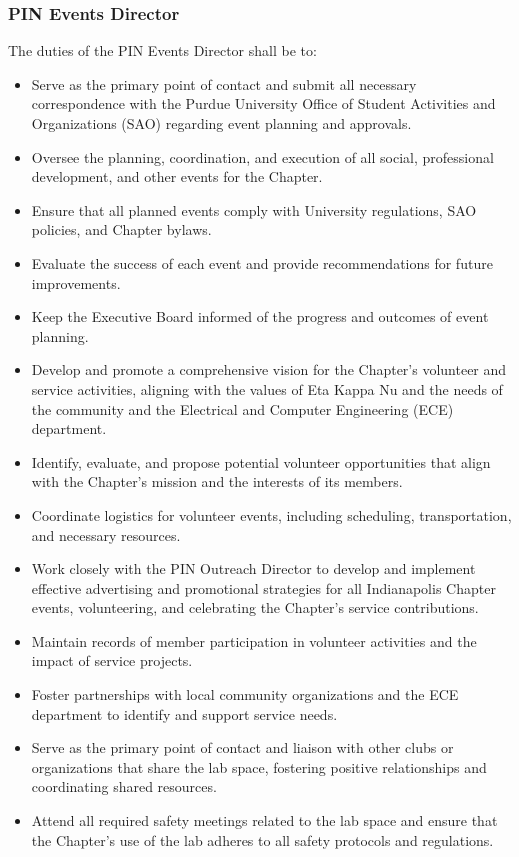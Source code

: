 \documentclass[10pt, oneside]{article}
\begin{document}
\subsubsection{PIN Events Director}
The duties of the PIN Events Director shall be to:
\begin{itemize}
    \item Serve as the primary point of contact and submit all necessary correspondence with the Purdue University Office of Student Activities and Organizations (SAO) regarding event planning and approvals.
    \item Oversee the planning, coordination, and execution of all social, professional development, and other events for the Chapter.
    \item Ensure that all planned events comply with University regulations, SAO policies, and Chapter bylaws.
    \item Evaluate the success of each event and provide recommendations for future improvements.
    \item Keep the Executive Board informed of the progress and outcomes of event planning.
	\item Develop and promote a comprehensive vision for the Chapter's volunteer and service activities, aligning with the values of Eta Kappa Nu and the needs of the community and the Electrical and Computer Engineering (ECE) department.
    \item Identify, evaluate, and propose potential volunteer opportunities that align with the Chapter's mission and the interests of its members.
    \item Coordinate logistics for volunteer events, including scheduling, transportation, and necessary resources.
	\item Work closely with the PIN Outreach Director to develop and implement effective advertising and promotional strategies for all Indianapolis Chapter events, volunteering, and celebrating the Chapter's service contributions.
    \item Maintain records of member participation in volunteer activities and the impact of service projects.
    \item Foster partnerships with local community organizations and the ECE department to identify and support service needs.
	\item Serve as the primary point of contact and liaison with other clubs or organizations that share the lab space, fostering positive relationships and coordinating shared resources.
    \item Attend all required safety meetings related to the lab space and ensure that the Chapter's use of the lab adheres to all safety protocols and regulations.

\end{itemize}
\end{document}

